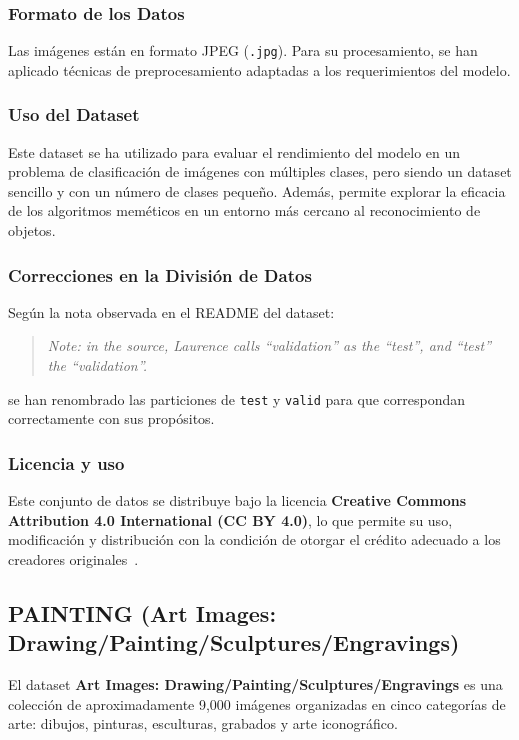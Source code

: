 \subsubsection{Formato de los Datos}
Las imágenes están en formato JPEG (\texttt{.jpg}). Para su procesamiento, se han aplicado técnicas de preprocesamiento
adaptadas a los requerimientos del modelo.

\subsubsection{Uso del Dataset}
Este dataset se ha utilizado para evaluar el rendimiento del modelo en un problema de clasificación de imágenes con
múltiples clases, pero siendo un dataset sencillo y con un número de clases pequeño.
Además, permite explorar la eficacia de los algoritmos meméticos en un entorno más cercano al reconocimiento de objetos.

\subsubsection{Correcciones en la División de Datos}
Según la nota observada en el README del dataset:
\begin{quote}
    \textit{Note: in the source, Laurence calls ``validation'' as the ``test'', and ``test'' the ``validation''.}
\end{quote}
se han renombrado las particiones de \texttt{test} y \texttt{valid} para que correspondan correctamente con sus
propósitos.

\subsubsection{Licencia y uso}
Este conjunto de datos se distribuye bajo la licencia
\textbf{Creative Commons Attribution 4.0 International (CC BY 4.0)}, lo que permite su uso, modificación y distribución
con la condición de otorgar el crédito adecuado a los creadores originales~\cite{moroney_laurence_nodate}.


\subsection{PAINTING (Art Images: Drawing/Painting/Sculptures/Engravings)}\label{subsec:painting}
El dataset \textbf{Art Images: Drawing/Painting/Sculptures/Engravings} es una colección de aproximadamente 9,000
imágenes organizadas en cinco categorías de arte: dibujos, pinturas, esculturas, grabados y arte iconográfico.

